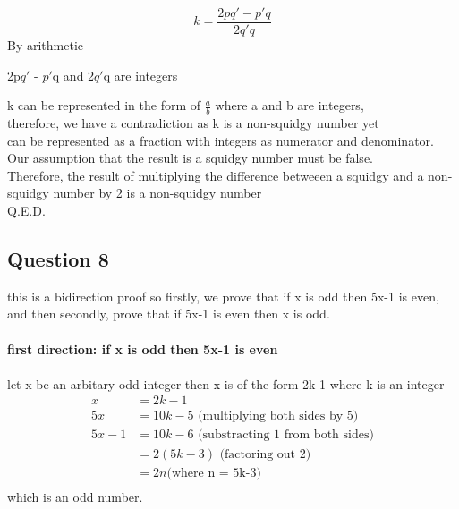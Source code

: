 \documentclass[11pt]{article}
\begin{document}
{{{\noindent
{\begin{displaymath}
    k = \frac{2pq\prime - p\prime q}{2 q\prime q}
\end{displaymath}
}
By arithmetic

\noindent
2p$q\prime$ - $p\prime$q and 2$q\prime$q are integers

\noindent
k can be represented in the form of $\frac{a}{b}$ where a and b are  integers, \\
therefore, we have a contradiction as k is a non-squidgy number yet \\
can be represented as a fraction with integers as numerator and denominator. \\
Our assumption that the result is a squidgy number must be false. \\
Therefore, the result of multiplying the difference betweeen a squidgy and a
non-squidgy number by 2 is a non-squidgy number \\
Q.E.D.

\subsection*{Question 8}
this is a bidirection proof so firstly, we prove that if x is odd
then 5x-1 is even, \\
and then secondly, prove that if 5x-1 is even then x is odd. \\
\\
\textbf{first direction: if x is odd then 5x-1 is even} \\
\\
let x be an arbitary odd integer then x is of the form 2k-1
where k is an integer \\
\begin{align*}
    x &= 2k-1 \\
    5x &= 10k - 5 \text{  (multiplying both sides by 5)} \\
    5x - 1 &= 10k - 6 \text{  (substracting 1 from both sides)} \\
    &=2(5k - 3) \text{  (factoring out 2)} \\
    &=2n \text{(where n = 5k-3)} \\
\end{align*}
which is an odd number.

}}}
\end{document}

